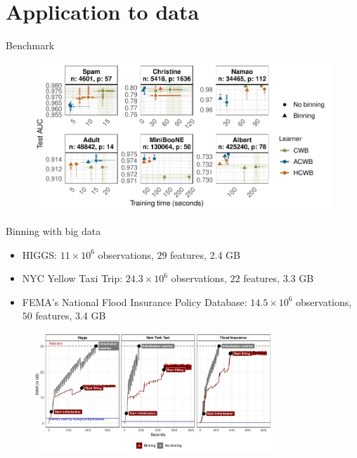 \documentclass[ignorenonframetext,]{beamer}
\providecommand{\tightlist}{%
  \setlength{\itemsep}{0pt}\setlength{\parskip}{0pt}}
\begin{document}
\hypertarget{application-to-data}{%
\section{Application to data}\label{application-to-data}}

\begin{frame}{Benchmark}
\protect\hypertarget{benchmark}{}
\begin{figure}
\centering
\includegraphics[width=1.1\textwidth]{figures/fig-eq2-2.pdf}
\end{figure}
\end{frame}

\begin{frame}{Binning with big data}
\protect\hypertarget{binning-with-big-data}{}
\begin{itemize}
\tightlist
\item
  HIGGS: \(11 \times 10^6\) observations, \(29\) features, 2.4 GB
\item
  NYC Yellow Taxi Trip: \(24.3 \times 10^6\) observations, \(22\)
  features, 3.3 GB
\item
  FEMA's National Flood Insurance Policy Database: \(14.5 \times 10^6\)
  observations, \(50\) features, 3.4 GB
\end{itemize}

\begin{figure}
\centering
\includegraphics[width=0.8\textwidth]{figures/app-big-data.pdf}
\end{figure}
\end{frame}
\end{document}
